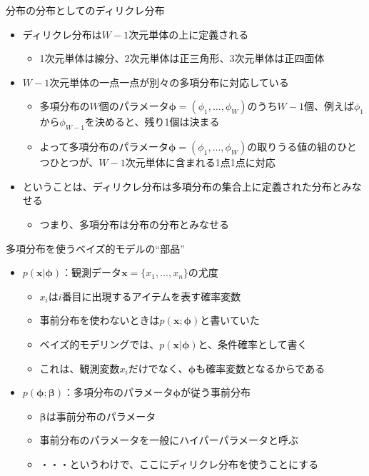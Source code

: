 \documentclass[aspectratio=169,unicode,dvipdfmx,14pt]{beamer}
\begin{document}
\begin{frame}{分布の分布としてのディリクレ分布}
\begin{itemize}
\item ディリクレ分布は$W-1$次元単体の上に定義される
\begin{itemize}
\item 1次元単体は線分、2次元単体は正三角形、3次元単体は正四面体
\end{itemize}
\item $W-1$次元単体の一点一点が別々の多項分布に対応している
\begin{itemize}
\item 多項分布の$W$個のパラメータ$\bm{\phi}=(\phi_1,\ldots,\phi_W)$のうち$W-1$個、例えば$\phi_1$から$\phi_{W-1}$を決めると、残り1個は決まる
\item よって多項分布のパラメータ$\bm{\phi}=(\phi_1,\ldots,\phi_W)$の取りうる値の組のひとつひとつが、$W-1$次元単体に含まれる1点1点に対応
\end{itemize}
\item ということは、ディリクレ分布は多項分布の集合上に定義された分布とみなせる
\begin{itemize}
\item つまり、多項分布は分布の分布とみなせる
\end{itemize}
\end{itemize}
\end{frame}

\begin{frame}{多項分布を使うベイズ的モデルの``部品''}
\begin{itemize}
\item $p(\bm{x}|\bm{\phi})$：観測データ$\bm{x}=\{x_1,\ldots,x_n\}$の尤度
\begin{itemize}
\item $x_i$は$i$番目に出現するアイテムを表す確率変数
\item 事前分布を使わないときは$p(\bm{x};\bm{\phi})$と書いていた
\item ベイズ的モデリングでは、$p(\bm{x}|\bm{\phi})$と、条件確率として書く
\item これは、観測変数$x_i$だけでなく、$\bm{\phi}$も確率変数となるからである
\end{itemize}
\item $p(\bm{\phi};\bm{\beta})$：多項分布のパラメータ$\bm{\phi}$が従う事前分布
\begin{itemize}
\item $\bm{\beta}$は事前分布のパラメータ
\item 事前分布のパラメータを一般にハイパーパラメータと呼ぶ
\item ・・・というわけで、ここにディリクレ分布を使うことにする
\end{itemize}
\end{itemize}
\end{frame}
\end{document}
